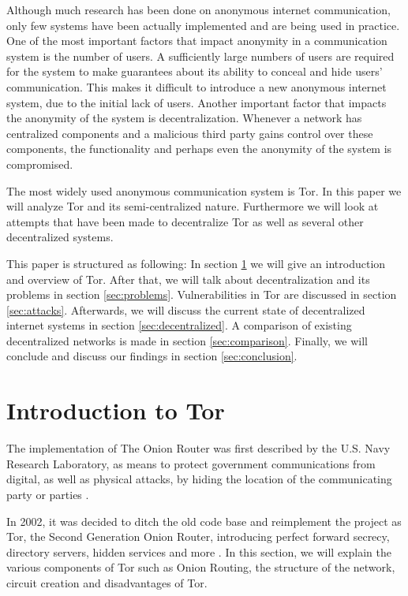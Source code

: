 \documentclass{article}
\begin{document}
	Although much research has been done on anonymous internet communication, only few systems have been actually implemented and are being used in practice. One of the most important factors that impact anonymity in a communication system is the number of users. A sufficiently large numbers of users are required for the system to make guarantees about its ability to conceal and hide users' communication. This makes it difficult to introduce a new anonymous internet system, due to the initial lack of users. Another important factor that impacts the anonymity of the system is decentralization. Whenever a network has centralized components and a malicious third party gains control over these components, the functionality and perhaps even the anonymity of the system is compromised.
	
	The most widely used anonymous communication system is Tor. In this paper we will analyze Tor and its semi-centralized nature. Furthermore we will look at attempts that have been made to decentralize Tor as well as several other decentralized systems.
	
	This paper is structured as following: In section \ref{sec:tor} we will give an introduction and overview of Tor. After that, we will talk about decentralization and its problems in section \ref{sec:problems}. Vulnerabilities in Tor are discussed in section \ref{sec:attacks}. Afterwards, we will discuss the current state of decentralized internet systems in section \ref{sec:decentralized}. A comparison of existing decentralized networks is made in section \ref{sec:comparison}. Finally, we will conclude and discuss our findings in section \ref{sec:conclusion}.
	
\section{Introduction to Tor}
	\label{sec:tor}
	
	The implementation of The Onion Router was first described by the U.S. Navy Research Laboratory, as means to protect government communications from digital, as well as physical attacks, by hiding the location of the communicating party or parties \cite{goldschlag1996hiding}.
	
	In 2002, it was decided to ditch the old code base and reimplement the project as Tor, the Second Generation Onion Router, introducing perfect forward secrecy, directory servers, hidden services and more \cite{dingledine2004tor}. In this section, we will explain the various components of Tor such as Onion Routing, the structure of the network, circuit creation and disadvantages of Tor.
	
\end{document}
